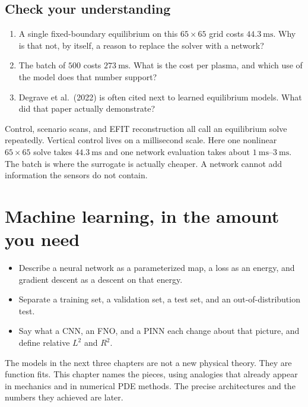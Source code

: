 \documentclass[11pt,a4paper,oneside,openany]{book}
\numberwithin{equation}{chapter}
\theoremstyle{definition}
\begin{document}
\section*{Check your understanding}
\begin{enumerate}[label=\textbf{Q7.\arabic*.},leftmargin=2.4em]
\item A single fixed-boundary equilibrium on this \(65\times 65\) grid costs \(\qty{44.3}{\milli\second}\). Why is that not, by itself, a reason to replace the solver with a network?
\item The batch of \(500\) costs \(\qty{273}{\milli\second}\). What is the cost per plasma, and which use of the model does that number support?
\item Degrave et al.\ (2022) is often cited next to learned equilibrium models. What did that paper actually demonstrate?
\end{enumerate}

\begin{keyideas}
Control, scenario scans, and EFIT reconstruction all call an equilibrium solve repeatedly. Vertical control lives on a millisecond scale. Here one nonlinear \(65\times 65\) solve takes \(\qty{44.3}{\milli\second}\) and one network evaluation takes about \(\qtyrange{1}{3}{\milli\second}\). The batch is where the surrogate is actually cheaper. A network cannot add information the sensors do not contain.
\end{keyideas}

\chapter{Machine learning, in the amount you need}
\label{ch:ml}

\begin{objectives}
\begin{itemize}[leftmargin=1.2em]
\item Describe a neural network as a parameterized map, a loss as an energy, and gradient descent as a descent on that energy.
\item Separate a training set, a validation set, a test set, and an out-of-distribution test.
\item Say what a CNN, an FNO, and a PINN each change about that picture, and define relative \(L^{2}\) and \(R^{2}\).
\end{itemize}
\end{objectives}

The models in the next three chapters are not a new physical theory. They are function fits. This chapter names the pieces, using analogies that already appear in mechanics and in numerical PDE methods. The precise architectures and the numbers they achieved are later.
\end{document}

